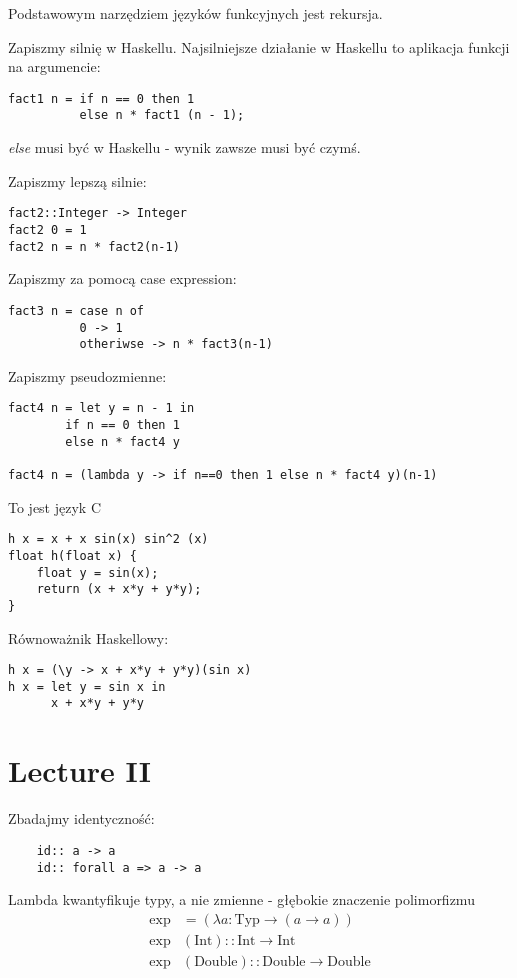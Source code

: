 \documentclass{article}
\newenvironment{information}[1]{%
    \trivlist
    \item[\hskip\labelsep\textbf{Information. #1.}]
    \ignorespaces
}{%
    \endtrivlist
}
\begin{document}
\noindent
Podstawowym narzędziem języków funkcyjnych jest rekursja.

\begin{information}{Silnia}
Zapiszmy silnię w Haskellu. Najsilniejsze działanie w Haskellu to aplikacja funkcji na argumencie:
\begin{verbatim}
fact1 n = if n == 0 then 1 
          else n * fact1 (n - 1);
\end{verbatim}
\textit{else} musi być w Haskellu - wynik zawsze musi być czymś.
\end{information}


\begin{information}{Pattern Matchings}
Zapiszmy lepszą silnie:
\begin{verbatim}
fact2::Integer -> Integer
fact2 0 = 1
fact2 n = n * fact2(n-1)
\end{verbatim}
\end{information}

\begin{information}{Case Expression}
Zapiszmy za pomocą case expression:
\begin{verbatim}
fact3 n = case n of
          0 -> 1
          otheriwse -> n * fact3(n-1) 
\end{verbatim}
\end{information}

\begin{information}{Pseudozmienne}
Zapiszmy pseudozmienne:
\begin{verbatim}
fact4 n = let y = n - 1 in
        if n == 0 then 1
        else n * fact4 y

fact4 n = (lambda y -> if n==0 then 1 else n * fact4 y)(n-1)
\end{verbatim}
\end{information}
To jest język C
\begin{verbatim}
h x = x + x sin(x) sin^2 (x)
float h(float x) {
    float y = sin(x);
    return (x + x*y + y*y);
}
\end{verbatim}
Równoważnik Haskellowy:
\begin{verbatim}
h x = (\y -> x + x*y + y*y)(sin x)
h x = let y = sin x in 
      x + x*y + y*y
\end{verbatim}

\section{Lecture II}

Zbadajmy identyczność:
\begin{verbatim}
    id:: a -> a
    id:: forall a => a -> a
\end{verbatim}
Lambda kwantyfikuje typy, a nie zmienne - głębokie znaczenie polimorfizmu\\
\begin{align}
    \exp &= \left(\lambda a: \text{Typ} \rightarrow (a\rightarrow a)\right)\\
    \exp & (\text{Int}) :: \text{Int} \rightarrow \text{Int}\\
    \exp & (\text{Double}) :: \text{Double} \rightarrow \text{Double}
\end{align}
\end{document}
